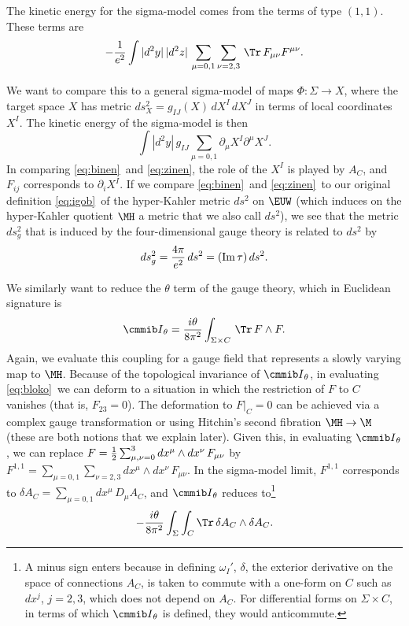 The kinetic energy for the sigma-model comes from the terms of
type $(1,1)$.  These terms are %
\setcounter{equation}{12}
\begin{equation}\label{eq:binen}
-{1\over e^2}\int
|d^2y|\,|d^2z|\,\sum_{\mu=0,1}\sum_{\nu=2,3}\,\Tr\,F_{\mu\nu}F^{\mu\nu}.
\end{equation}

We want to compare this to a general sigma-model of maps
$\Phi:\Sigma\to X$, where the target space $X$ has metric
$ds^2_X=g_{IJ}(X)\,dX^I\,dX^J$ in terms of local coordinates
$X^I$.  The kinetic energy of the sigma-model is then
\setcounter{equation}{13}
\begin{equation}\label{eq:zinen}
\int |d^2y|\, g_{IJ}\sum_{\mu=0,1}\partial_\mu
X^I\partial^\mu X^J.
\end{equation}
 In comparing \eqref{eq:binen}\ and \eqref{eq:zinen}, the role of
the $X^I$ is played by $A_C$, and $F_{ij}$ corresponds to
$\partial_i X^I$.  If we compare \eqref{eq:binen}\ and \eqref{eq:zinen}\ to our
original definition \eqref{eq:igob}\ of the hyper-Kahler metric $ds^2$ on
${\EUW}$ (which induces   on the hyper-Kahler quotient $\MH$ a
metric that we also call $ds^2$), we see that the metric $ds^2_g$
that is induced by the four-dimensional gauge theory is related to
$ds^2$ by %
\setcounter{equation}{14}
\begin{equation}\label{eq:inog}
ds^2_g={4\pi\over e^2}\,ds^2=({\rm
Im}\,\tau)\,ds^2.
\end{equation}

We similarly want to reduce the $\theta$ term of the gauge theory,
which in Euclidean signature is %
\setcounter{equation}{15}
\begin{equation}\label{eq:bloko}
{\cmmib
I}_\theta={i\theta\over 8\pi^2}\int_{\Sigma\times C}\,\Tr\,
F\wedge F.
\end{equation}
 Again, we evaluate this coupling for a gauge field
that represents a slowly varying map to $\MH$.  Because of the
topological invariance of ${{\cmmib I}}_\theta$, in evaluating
\eqref{eq:bloko}\ we can deform to a situation in which the restriction of
$F$ to $C$ vanishes (that is, $F_{23}=0$).  The deformation to
$F|_C=0$ can be achieved via a complex gauge transformation or
using Hitchin's second fibration $\MH\to\M$ (these are both
notions that we explain later).  Given this, in evaluating
${\cmmib I}_\theta$, we can replace $F={1\over
2}\sum_{\mu,\nu=0}^3dx^\mu\wedge dx^\nu \,F_{\mu\nu}$ by
$F^{1,1}=\sum_{\mu=0,1}\sum_{\nu=2,3}dx^\mu\wedge dx^\nu
\,F_{\mu\nu}$. In the sigma-model limit, $F^{1,1}$ corresponds to
$\delta A_C=\sum_{\mu=0,1}dx^\mu \,D_\mu A_C$, and ${\cmmib
I}_\theta$ reduces to\footnote{A minus sign enters because in defining
$\omega_I'$, $\delta$, the exterior derivative on the space of
connections $A_C$, is taken to commute with a one-form on $C$ such
as $dx^ j$, $j=2,3$, which does not depend on $A_C$. For
differential forms on $\Sigma\times C$, in terms of which ${\cmmib
I}_\theta$ is defined, they would anticommute.}
\setcounter{equation}{16}
\begin{equation}\label{eq:ino}
-{i\theta\over 8\pi^2}\int_\Sigma \int_C \Tr\,\delta
A_C\wedge \delta A_C.
\end{equation}

